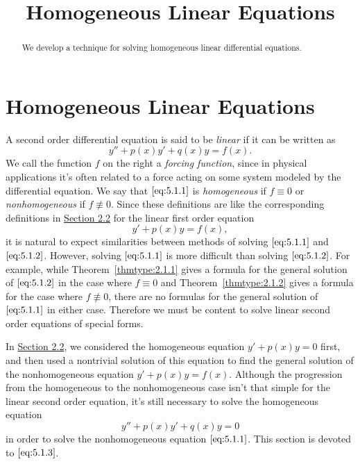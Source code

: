 \documentclass{ximera}
\title{Homogeneous Linear Equations}%
\begin{document}
 
\begin{abstract}
We develop a technique for solving homogeneous linear differential equations.
\end{abstract}
 
\maketitle
 
\section*{Homogeneous Linear Equations}
 
A second order differential equation is said to be \textit{linear} if
it can be written as
\begin{equation}\label{eq:5.1.1}
y''+p(x)y'+q(x)y=f(x).
\end{equation}
We call the function $f$ on the right a \textit{forcing function},
since in physical applications it's often related to a force acting
on some system modeled by the differential equation. We say that
$\eqref{eq:5.1.1}$ is \textit{homogeneous} if $f\equiv0$ or \textit{nonhomogeneous} if $f\not\equiv0$. Since these definitions are like
the corresponding definitions in \href{https://xerxes.ximera.org/differentialequations/main/linearFirstOrderDiffEq/linearFirstOrderDiffEq}{Section 2.2} for the linear
first order equation
\begin{equation}\label{eq:5.1.2}
y'+p(x)y=f(x),
\end{equation}
it is natural to expect similarities between methods of solving
$\eqref{eq:5.1.1}$ and $\eqref{eq:5.1.2}$. However, solving $\eqref{eq:5.1.1}$ is more
difficult than solving $\eqref{eq:5.1.2}$. For example, while
Theorem~\ref{thmtype:2.1.1} gives a formula for the general solution of
$\eqref{eq:5.1.2}$ in the case where $f\equiv0$ and
Theorem~\ref{thmtype:2.1.2} gives
a formula for the case where $f\not\equiv0$, there are no formulas for
the general solution of $\eqref{eq:5.1.1}$ in either case. Therefore we must
be content to solve linear second order equations of special forms.
 
In \href{https://xerxes.ximera.org/differentialequations/main/linearFirstOrderDiffEq/linearFirstOrderDiffEq}{Section 2.2},
we considered the homogeneous equation
$y'+p(x)y=0$ first, and then used a nontrivial solution of this
equation to find the general solution of the nonhomogeneous equation
$y'+p(x)y=f(x)$. Although the progression from the homogeneous to the
nonhomogeneous case isn't  that simple for the linear second order
equation, it's still necessary to solve the homogeneous equation
\begin{equation}\label{eq:5.1.3}
y''+p(x)y'+q(x)y=0
\end{equation}
in order to solve the nonhomogeneous equation $\eqref{eq:5.1.1}$. This
section is devoted to $\eqref{eq:5.1.3}$.
 
\end{document}

